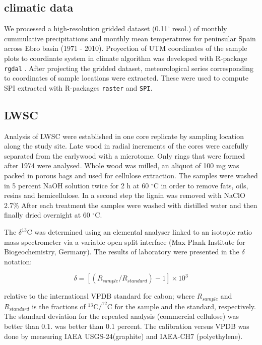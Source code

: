 \documentclass[review,authoryear]{elsarticle}
\begin{document}
\subsection{climatic data}
We processed a high-resolution gridded dataset (0.11$^{\circ}$ resol.)
of monthly cummulative precipitations and monthly mean temperatures
for peninsular Spain \citep[~Spain02]{Herrera2015} across Ebro basin
(1971 - 2010). Proyection of UTM coordinates of the sample plots to
coordinate system in climate algorithm was developed with R-package
{\tt rgdal} \citep{Bivand2015}. After projecting the gridded dataset,
meteorological series corresponding to coordinates of sample locations
were extracted. These were used to compute \gls{SPI} extracted with
R-packages {\tt raster} \citep{Hijmans2015} and {\tt SPI}.

\subsection{\acrlong{LWSC}}
Analysis of \gls{LWSC} were established in one core replicate by
sampling location along the study site. Late wood in radial increments
of the cores were carefully separated from the earlywood with a
microtome. Only rings that were formed after 1974 were analysed. Whole
wood was milled, an aliquot of 100 mg was packed in porous bags and
used for cellulose extraction. The samples were washed in 5 percent
NaOH solution twice for 2 h at 60 $^{\circ}$C in order to remove fats,
oils, resins and hemicellulose. In a second step the lignin was
removed with NaClO 2.7\% After each treatment the samples were washed
with distilled water and then finally dried overnight at 60
$^{\circ}$C.

The $\delta^{13}$C was determined using an elemental analyser linked
to an isotopic ratio mass spectrometer via a variable open split
interface (Max Plank Institute for Biogeochemistry, Germany). The
results of laboratory were presented in the $\delta$ notation:

\begin{equation}\label{eq:dC}
\delta = \left [ \left ( R_{sample}/R_{standard} \right )-1 \right ]\times 10^3 
\end{equation}

relative to the internationsl VPDB standard for cabon; where
$R_{sample}$ and $R_{standard}$ is the fractions of $^{13}$C$/^{12}$C
for the sample and the standard, respectively. The standard deviation
for the repeated analysis (commercial cellulose) was better than
0.1. was better than 0.1 percent. The calibration versus VPDB was done
by measuring IAEA USGS-24(graphite) and IAEA-CH7 (polyethylene).
\end{document}
